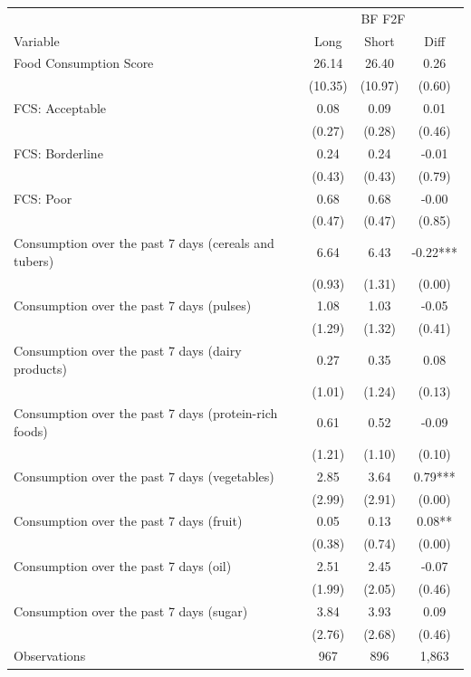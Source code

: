\begin{tabular}{l*{3}c}
\hline\hline
 & \multicolumn{3}{c}{BF F2F}\\ 
Variable & Long & Short & Diff \\
\hline
Food Consumption Score&26.14&26.40&0.26\\
&(10.35)&(10.97)&(0.60)\\
FCS: Acceptable&0.08&0.09&0.01\\
&(0.27)&(0.28)&(0.46)\\
FCS: Borderline&0.24&0.24&-0.01\\
&(0.43)&(0.43)&(0.79)\\
FCS: Poor&0.68&0.68&-0.00\\
&(0.47)&(0.47)&(0.85)\\
Consumption over the past 7 days (cereals and tubers)&6.64&6.43&-0.22***\\
&(0.93)&(1.31)&(0.00)\\
Consumption over the past 7 days (pulses)&1.08&1.03&-0.05\\
&(1.29)&(1.32)&(0.41)\\
Consumption over the past 7 days (dairy products)&0.27&0.35&0.08\\
&(1.01)&(1.24)&(0.13)\\
Consumption over the past 7 days (protein-rich foods)&0.61&0.52&-0.09\\
&(1.21)&(1.10)&(0.10)\\
Consumption over the past 7 days (vegetables)&2.85&3.64&0.79***\\
&(2.99)&(2.91)&(0.00)\\
Consumption over the past 7 days (fruit)&0.05&0.13&0.08**\\
&(0.38)&(0.74)&(0.00)\\
Consumption over the past 7 days (oil)&2.51&2.45&-0.07\\
&(1.99)&(2.05)&(0.46)\\
Consumption over the past 7 days (sugar)&3.84&3.93&0.09\\
&(2.76)&(2.68)&(0.46)\\
\hline
Observations & 967 & 896 & 1,863 \\
\hline\hline
\end{tabular}
